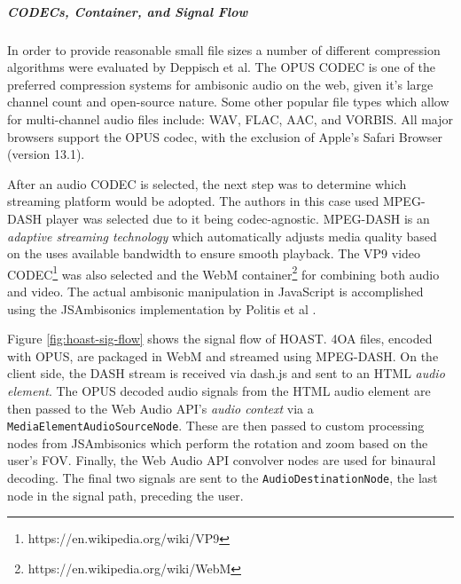 \subparagraph{CODECs, Container, and Signal Flow}

In order to provide reasonable small file sizes a number of different compression algorithms were evaluated by Deppisch et al. The OPUS CODEC is one of the preferred compression systems for ambisonic audio on the web, given it's large channel count and open-source nature. Some other popular file types which allow for multi-channel audio files include: WAV, FLAC, AAC, and VORBIS. All major browsers support the OPUS codec, with the exclusion of Apple's Safari Browser (version 13.1). 

After an audio CODEC is selected, the next step was to determine which streaming platform would be adopted. The authors in this case used MPEG-DASH player was selected due to it being codec-agnostic. MPEG-DASH is an \textit{adaptive streaming technology} which automatically adjusts media quality based on the uses available bandwidth to ensure smooth playback. The VP9 video CODEC\footnote{https://en.wikipedia.org/wiki/VP9} was also selected and the WebM container\footnote{https://en.wikipedia.org/wiki/WebM} for combining both audio and video. The actual ambisonic manipulation in JavaScript is accomplished using the JSAmbisonics implementation by Politis et al \cite{politis2016jsambisonics}.

Figure \ref{fig:hoast-sig-flow} shows the signal flow of HOAST. 4OA files, encoded with OPUS, are packaged in WebM and streamed using MPEG-DASH. On the client side, the DASH stream is received via dash.js and sent to an HTML \textit{audio element}. The OPUS decoded audio signals from the HTML audio element are then passed to the Web Audio API's \textit{audio context} via a \texttt{MediaElementAudioSourceNode}. These are then passed to custom processing nodes from JSAmbisonics \cite{politis2016jsambisonics} which perform the rotation and zoom based on the user's FOV. Finally, the Web Audio API convolver nodes are used for binaural decoding. The final two signals are sent to the \texttt{AudioDestinationNode}, the last node in the signal path, preceding the user. 

